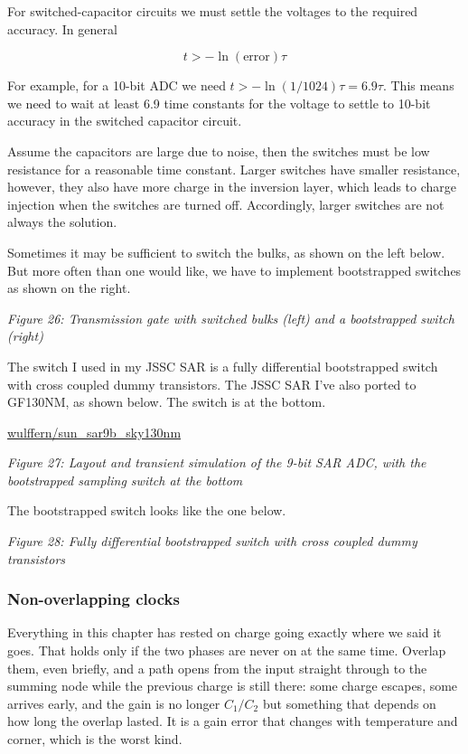 For switched-capacitor circuits we must settle the voltages to the
required accuracy. In general

\[t > -\ln(\text{error} ) \tau\]

For example, for a 10-bit ADC we need
\(t > -\ln(1/1024) \tau = 6.9\tau\). This means we need to wait at least
6.9 time constants for the voltage to settle to 10-bit accuracy in the
switched capacitor circuit.

Assume the capacitors are large due to noise, then the switches must be
low resistance for a reasonable time constant. Larger switches have
smaller resistance, however, they also have more charge in the inversion
layer, which leads to charge injection when the switches are turned off.
Accordingly, larger switches are not always the solution.

Sometimes it may be sufficient to switch the bulks, as shown on the left
below. But more often than one would like, we have to implement
bootstrapped switches as shown on the right.


{
\centering
{}
}

\emph{Figure 26: Transmission gate with switched bulks (left) and a
bootstrapped switch (right)}

The switch I used in my JSSC SAR  is a
fully differential bootstrapped switch with cross coupled dummy
transistors. The JSSC SAR I've also ported to GF130NM, as shown below.
The switch is at the bottom.

\href{https://github.com/wulffern/sun_sar9b_sky130nm}{wulffern/sun\_sar9b\_sky130nm}


{
\centering
{}
}

\emph{Figure 27: Layout and transient simulation of the 9-bit SAR ADC,
with the bootstrapped sampling switch at the bottom}

The bootstrapped switch looks like the one below.


{
\centering
{}
}

\emph{Figure 28: Fully differential bootstrapped switch with cross
coupled dummy transistors}

\subsubsection{Non-overlapping clocks}\label{non-overlapping-clocks}

Everything in this chapter has rested on charge going exactly where we
said it goes. That holds only if the two phases are never on at the same
time. Overlap them, even briefly, and a path opens from the input
straight through to the summing node while the previous charge is still
there: some charge escapes, some arrives early, and the gain is no
longer \(C_1/C_2\) but something that depends on how long the overlap
lasted. It is a gain error that changes with temperature and corner,
which is the worst kind.

